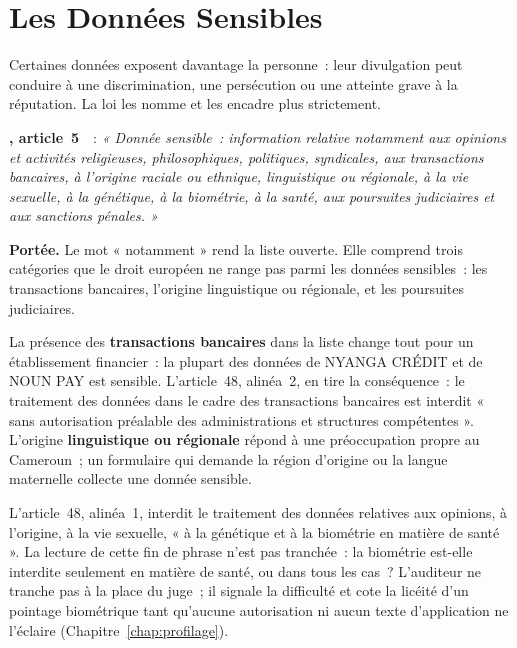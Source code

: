 \section{Les Données Sensibles}
\label{sec:c01-sensibles}

Certaines données exposent davantage la personne~: leur divulgation peut
conduire à une discrimination, une persécution ou une atteinte grave à la
réputation. La loi les nomme et les encadre plus strictement.

\begin{boxjuris}
\textbf{, article~5}~\cite{loi2024017}~:
\textit{« Donnée sensible~: information relative notamment aux opinions et
activités religieuses, philosophiques, politiques, syndicales, aux
transactions bancaires, à l'origine raciale ou ethnique, linguistique ou
régionale, à la vie sexuelle, à la génétique, à la biométrie, à la santé,
aux poursuites judiciaires et aux sanctions pénales. »}

\smallskip
\textbf{Portée.} Le mot « notamment » rend la liste ouverte. Elle comprend
trois catégories que le droit européen ne range pas parmi les données
sensibles~: les transactions bancaires, l'origine linguistique ou régionale,
et les poursuites judiciaires.
\end{boxjuris}

La présence des \textbf{transactions bancaires} dans la liste change tout
pour un établissement financier~: la plupart des données de NYANGA CRÉDIT
et de NOUN PAY est sensible. L'article~48, alinéa~2, en tire la
conséquence~: le traitement des données dans le cadre des transactions
bancaires est interdit « sans autorisation préalable des administrations et
structures compétentes ». L'origine \textbf{linguistique ou régionale}
répond à une préoccupation propre au Cameroun~; un formulaire qui demande la
région d'origine ou la langue maternelle collecte une donnée sensible.

L'article~48, alinéa~1, interdit le traitement des données relatives aux
opinions, à l'origine, à la vie sexuelle, « à la génétique et à la
biométrie en matière de santé ». La lecture de cette fin de phrase n'est
pas tranchée~: la biométrie est-elle interdite seulement en matière de
santé, ou dans tous les cas~? L'auditeur ne tranche pas à la place du juge~;
il signale la difficulté et cote \NEK{} la licéité d'un pointage
biométrique tant qu'aucune autorisation ni aucun texte d'application ne
l'éclaire (Chapitre~\ref{chap:profilage}).

